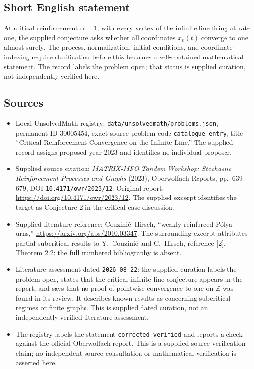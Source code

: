 \documentclass[11pt]{article}
\newcommand{\Z}{\mathbb{Z}}
\begin{document}
\subsection{Short English statement}
At critical reinforcement \(\alpha=1\), with every vertex of the infinite line firing at rate one, the supplied conjecture asks whether all coordinates \(x_v(t)\) converge to one almost surely. The process, normalization, initial conditions, and coordinate indexing require clarification before this becomes a self-contained mathematical statement. The record labels the problem open; that status is supplied curation, not independently verified here.
\subsection{Sources}
\begin{itemize}
\item Local UnsolvedMath registry: \texttt{data/unsolvedmath/problems.json}, permanent ID \(30005454\), exact source problem code \texttt{catalogue entry}, title ``Critical Reinforcement Convergence on the Infinite Line.'' The supplied record assigns proposed year 2023 and identifies no individual proposer.
\item Supplied source citation: \emph{MATRIX-MFO Tandem Workshop: Stochastic Reinforcement Processes and Graphs} (2023), Oberwolfach Reports, pp.\ 639--679, DOI \texttt{10.4171/owr/2023/12}. Original report: \url{https://doi.org/10.4171/owr/2023/12}. The supplied excerpt identifies the target as Conjecture 2 in the critical-case discussion.
\item Supplied literature reference: Couzinié--Hirsch, ``weakly reinforced Pólya urns,'' \url{https://arxiv.org/abs/2010.03347}. The surrounding excerpt attributes partial subcritical results to Y.\ Couzinié and C.\ Hirsch, reference [2], Theorem 2.2; the full numbered bibliography is absent.
\item Literature assessment dated \texttt{2026-08-22}: the supplied curation labels the problem open, states that the critical infinite-line conjecture appears in the report, and says that no proof of pointwise convergence to one on \(\Z\) was found in its review. It describes known results as concerning subcritical regimes or finite graphs. This is supplied dated curation, not an independently verified literature assessment.
\item The registry labels the statement \texttt{corrected\_verified} and reports a check against the official Oberwolfach report. This is a supplied source-verification claim; no independent source consultation or mathematical verification is asserted here.
\end{itemize}
\end{document}
